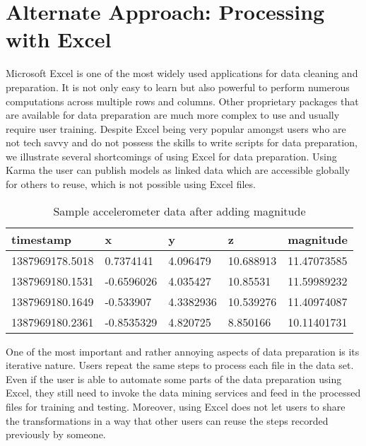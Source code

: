 \section{Alternate Approach: Processing with Excel}

Microsoft Excel is one of the most widely used applications for data cleaning and preparation. It is not only easy to learn but also powerful to perform numerous computations across multiple rows and columns. Other proprietary packages that are available for data preparation are much more complex to use and usually require  user training. Despite Excel being very popular amongst users who are not tech savvy and do not possess the skills to write scripts for data preparation, we illustrate several shortcomings of using Excel for data preparation. Using Karma the user can publish models as linked data which are accessible globally for others to reuse, which is not possible using Excel files.

\begin{table}[h]
	\centering	
	\caption{Sample accelerometer data after adding magnitude\label{tab:sample_data_acce}}
  	\begin{tabular}{ | p{2cm} | p{1.3cm} | p{1cm} | p{1cm} | p{1.5cm} | }
    	\hline
	    \textbf{timestamp} & \textbf{x} & \textbf{y} & \textbf{z} & \textbf{magnitude} \\ \hline
		1387969178.5018 & 0.7374141 & 4.096479 & 10.688913 & 11.47073585 \\ \hline
		1387969180.1531 & -0.6596026 & 4.035427 & 10.85531 & 11.59989232 \\ \hline
		1387969180.1649 & -0.533907 & 4.3382936 & 10.539276 & 11.40974087 \\ \hline
		1387969180.2361 & -0.8535329 & 4.820725 & 8.850166 & 10.11401731 \\
	    \hline
  	\end{tabular}
\end{table}

One of the most important and rather annoying aspects of data preparation is its iterative nature. Users repeat the same steps to process each file in the data set. Even if the user is able to automate some parts of the data preparation using Excel, they still need to invoke the data mining services and feed in the processed files for training and testing. Moreover, using Excel does not let users to share the transformations in a way that other users can reuse the steps recorded previously by someone. 

